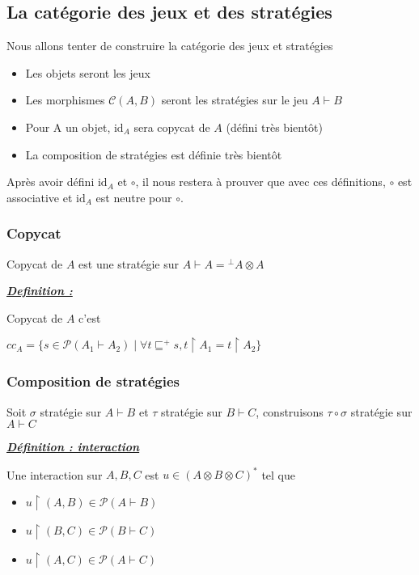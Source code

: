 \documentclass[a4paper,12ptCOUCOU
]{article}
\newlength{\mydepth}
\newlength{\myheight}
\newenvironment{answer}
{\par\begin{lrbox}{\mybox}\quad\begin{minipage}{\linewidth}\color{black}\setlength{\parskip}{10pt plus 1pt minus 1pt}\vspace*{-.7\baselineskip}}
{\end{minipage}\end{lrbox}
\settodepth{\mydepth}{\usebox{\mybox}}
\settoheight{\myheight}{\usebox{\mybox}}
\addtolength{\myheight}{\mydepth}
\noindent\makebox[0pt]{
  \color{gray}\hspace{-0pt}\rule[-\mydepth]{1pt}{\myheight}}
\usebox{\mybox}
  }
\begin{document}
\subsection{La catégorie des jeux et des stratégies}

Nous allons tenter de construire la catégorie des jeux et stratégies

\begin{itemize}
\item Les objets seront les jeux
\item Les morphismes $\mathcal{C}(A,B)$ seront les stratégies sur le jeu $A \vdash B$
\item Pour A un objet, $\text{id}_A$ sera copycat de $A$ (défini très bientôt)
\item La composition de stratégies est définie très bientôt
\end{itemize}

Après avoir défini $\text{id}_A$ et $\circ$, il nous restera à prouver
que avec ces définitions, $\circ$ est associative et $\text{id}_A$ est neutre
pour $\circ$.

\subsubsection{Copycat}

Copycat de $A$ est une stratégie sur $A \vdash A = {}^\bot A \otimes A$

\vspace{0.4cm}\begin{minipage}{\linewidth}\textbf{\textit{\underline{ Definition : }}} \begin{answer}
Copycat de $A$ c'est

$cc_A=\{s \in \mathcal{P}(A_1 \vdash A_2) \mid \forall t \sqsubseteq^+ s, t \upharpoonright A_1 = t \upharpoonright A_2\}$
\end{answer}\end{minipage}


\subsubsection{Composition de stratégies}

Soit $\sigma$ stratégie sur $A\vdash B$ et $\tau$ stratégie sur $B \vdash C$,
construisons $\tau \circ \sigma$ stratégie sur $A \vdash C$

\vspace{0.4cm}\begin{minipage}{\linewidth}\textbf{\textit{\underline{ Définition : interaction }}} \begin{answer}

Une interaction sur $A, B, C$ est $u \in (A \otimes B \otimes C)^*$ tel que
\begin{itemize}
\item $u \upharpoonright (A, B) \in \mathcal{P}(A \vdash B)$
\item $u \upharpoonright (B, C) \in \mathcal{P}(B \vdash C)$
\item $u \upharpoonright (A, C) \in \mathcal{P}(A \vdash C)$
\end{itemize}
\end{answer}\end{minipage}
\end{document}
